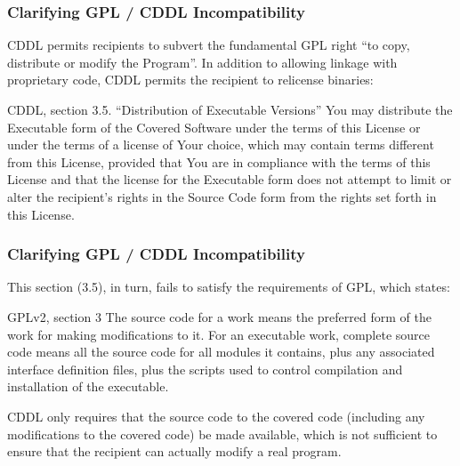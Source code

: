\begin{frame}
\frametitle{Clarifying GPL / CDDL Incompatibility}

CDDL permits recipients to subvert the fundamental GPL right ``to copy, distribute or modify the Program''. In addition to allowing linkage with proprietary code, CDDL permits the recipient to relicense binaries:

\begin{block}{CDDL, section 3.5. ``Distribution of Executable Versions''}
\footnotesize
You may distribute the Executable form of the Covered Software under the terms of this License or under the terms of a license of Your choice, which may contain terms different from this License, provided that You are in compliance with the terms of this License and that the license for the Executable form does not attempt to limit or alter the recipient's rights in the Source Code form from the rights set forth in this License.
\end{block}

\end{frame}


\begin{frame}
\frametitle{Clarifying GPL / CDDL Incompatibility}

This section (3.5), in turn, fails to satisfy the requirements of GPL, which states:

\begin{block}{GPLv2, section 3}
\footnotesize
The source code for a work means the preferred form of the work for making modifications to it. For an executable work, complete source code means all the source code for all modules it contains, plus any associated interface definition files, plus the scripts used to control compilation and installation of the executable. 
\end{block}

CDDL only requires that the source code to the covered code (including any modifications to the covered code) be made available, which is not sufficient to ensure that the recipient can actually modify a real program. 

\end{frame}





